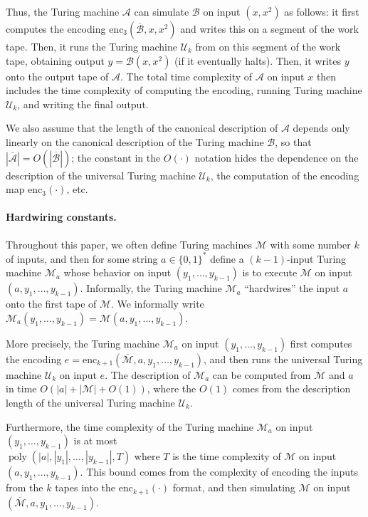 \documentclass[11pt]{article}
\theoremstyle{definition}
\DeclareMathOperator{\poly}{poly}
\newcommand{\desc}[1]{\overline{\cal{#1}}}
\renewcommand{\cal}[1]{\mathcal{#1}}
\begin{document}
Thus, the Turing machine $\cal{A}$ can simulate $\cal{B}$ on input $(x,x^2)$ as follows: it first computes
the encoding $\mathrm{enc}_3(\desc{\cal{B}},x,x^2)$ and writes this on a segment of the work tape. Then, it runs
the Turing machine $\cal{U}_k$ from  on this segment of the work tape, obtaining 
output $y = \cal{B}(x,x^2)$ (if it eventually halts). Then, it writes $y$ onto the output tape of
$\cal{A}$. The total time complexity of $\cal{A}$ on input $x$ then includes the time complexity 
of computing the encoding, running Turing machine $\cal{U}_k$, and writing the final output. 

We also assume that the length of the canonical description of $\cal{A}$ 
depends only linearly on the canonical description of the Turing machine $\cal{B}$, so that
$|\desc{\cal{A}}| = O(|\desc{\cal{B}}|)$; the constant in the $O(\cdot)$ notation hides
the dependence on the description of the universal Turing machine $\cal{U}_k$, the computation
of the encoding map $\mathrm{enc}_3(\cdot)$, etc. 






\paragraph{Hardwiring constants.} 
Throughout this paper, we often define Turing machines $\cal{M}$
with some number $k$ of inputs, and then for some string $a \in \{0,1\}^*$
define a $(k-1)$-input Turing machine $\cal{M}_a$ whose behavior on input
$(y_1,\ldots,y_{k-1})$ is to execute $\cal{M}$ on input
$(a,y_1,\ldots,y_{k-1})$.
Informally, the Turing machine $\cal{M}_a$ ``hardwires'' the input $a$ onto the
first tape of $\cal{M}$.
We  informally write $\cal{M}_a(y_1,\ldots,y_{k-1}) =
\cal{M}(a,y_1,\ldots,y_{k-1})$.

More precisely, the Turing machine $\cal{M}_a$ on input $(y_1,\ldots,y_{k-1})$ first
computes the encoding $e = \mathrm{enc}_{k+1}(\desc{\cal{M}},a,y_1,\ldots,y_{k-1})$, and then runs the
universal Turing machine $\cal{U}_k$ on input $e$.
The description of $\cal{M}_a$ can be computed from $\desc{\cal{M}}$ and $a$ in
time $O(|a| + |\cal{M}| + O(1))$, where the $O(1)$ comes from the description
length of the universal Turing machine $\cal{U}_k$.

Furthermore, the time complexity of the Turing machine $\cal{M}_a$ on input
$(y_1,\ldots,y_{k-1})$ is at most \\ $\poly(|a|,|y_1|,\ldots,|y_{k-1}|,T)$ where $T$
is the time complexity of $\cal{M}$ on input $(a,y_1,\ldots,y_{k-1})$.
This bound comes from the complexity of encoding the inputs from the $k$ tapes
into the $\mathrm{enc}_{k+1}(\cdot)$ format, and then simulating $\cal{M}$ on input
$(\desc{\cal{M}},a,y_1,\ldots,y_{k-1})$.
\end{document}
